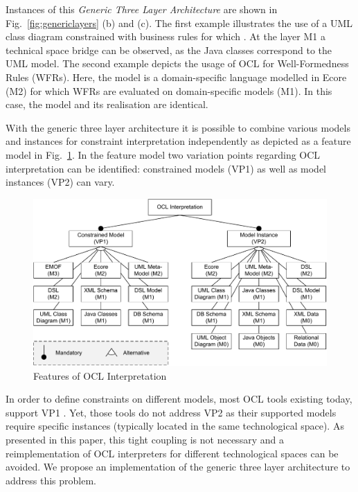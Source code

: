 Instances of this \emph{Generic Three Layer Architecture} are shown in Fig.~\ref{fig:genericlayers} 
(b) and (c). The first example illustrates the use of a UML class diagram constrained with business
rules for which . At the layer M1 a technical space bridge can be observed, as the Java
classes correspond to the UML model. The second example depicts the usage of OCL for Well-Formedness
Rules (WFRs). Here, the model is a domain-specific language modelled in Ecore (M2) for which WFRs are
evaluated on domain-specific models (M1). In this case, the model and its realisation are identical.

With the generic three layer architecture it is possible to combine various models and instances for
constraint interpretation independently as depicted as a feature model in Fig.~\ref{fig:features}. 
 In the feature model two variation
points regarding OCL interpretation can be identified: constrained models (VP1) as well as
model instances (VP2) can vary. 

	\begin{figure}[t]
			\centering
		  \includegraphics[width=1.00\textwidth]{figures/features.pdf}
			\caption{Features of OCL Interpretation}
			\label{fig:features}
	\end{figure}
	
In order to define constraints on different models, most OCL tools existing today, support VP1 
\cite{WWW:MDT,akehurst2003ocl,WWW:dresdenOCL,kolovos2008detecting}. Yet, those tools do not address
VP2 as their supported models require specific instances (typically located in the same technological
space). As presented in this paper, this tight coupling is not necessary and a reimplementation of
OCL interpreters for different technological spaces can be avoided.
We propose an implementation of the generic three layer architecture to address this problem.

